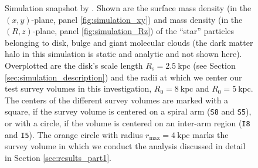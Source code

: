 \documentclass[iop,revtex4,numberedappendix,appendixfloats]{emulateapj}
\newcommand{\hiddenComment}[1]{}
\begin{document}
\begin{figure}[!htbp]
\caption{Simulation snapshot by \citet{2013ApJ...766...34D}. Shown are the surface mass density (in the $(x,y)$-plane, panel \ref{fig:simulation_xy}) and mass density (in the $(R,z)$-plane, panel \ref{fig:simulation_Rz}) of the ``star'' particles belonging to disk, bulge and giant molecular clouds (the dark matter halo in this simulation is static and analytic and not shown here). Overplotted are the disk's scale length $R_\text{s}=2.5~\text{kpc}$ (see Section \ref{sec:simulation_description}) and the radii at which we center our test survey volumes in this investigation, $R_0=8~\text{kpc}$ and $R_0 = 5~\text{kpc}$. The centers of the different survey volumes are marked with a square, if the survey volume is centered on a spiral arm (\texttt{S8} and \texttt{\texttt{S5}}), or with a circle, if the volume is centered on an inter-arm region (\texttt{I8} and \texttt{\texttt{I5}}). The orange circle with radius $r_\text{max}=4~\text{kpc}$ marks the survey volume in which we conduct the analysis discussed in detail in Section \ref{sec:results_part1}. \hiddenComment{[TO DO: Check that this figure works in black and white.]}}
\label{fig:simulation}
\end{figure}
\end{document}
